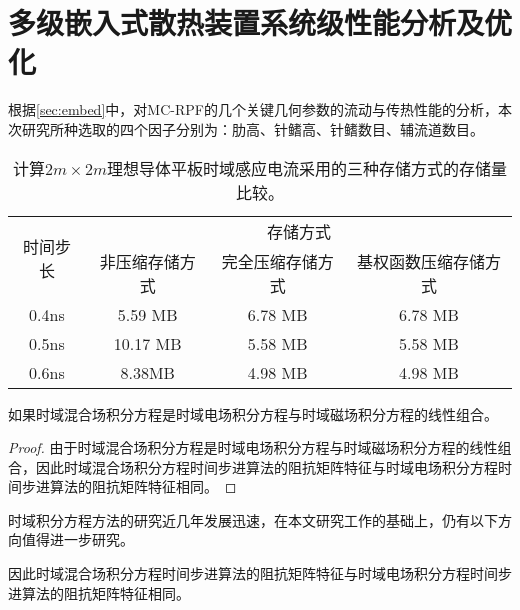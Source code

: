 
\chapter{多级嵌入式散热装置系统级性能分析及优化}

根据\cref{sec:embed}中，对MC-RPF的几个关键几何参数的流动与传热性能的分析，本次研究所种选取的四个因子分别为：肋高、针鳍高、针鳍数目、辅流道数目。

\begin{table}[h]
    \caption{计算$2m\times 2m$理想导体平板时域感应电流采用的三种存储方式的存储量比较。}
    \begin{tabular}{cccc}
        \toprule
        \multirow{2}{*}{时间步长} & \multicolumn{3}{c}{存储方式} \\
        \cmidrule{2-4}
        & 非压缩存储方式 & 完全压缩存储方式 & 基权函数压缩存储方式 \\
        \midrule
        0.4ns & 5.59 MB & 6.78 MB & 6.78 MB\\
        0.5ns & 10.17 MB & 5.58 MB & 5.58 MB \\
        0.6ns & 8.38MB & 4.98 MB & 4.98 MB \\
        \bottomrule
        \end{tabular}
    \label{tablea}
    \end{table}

\begin{theorem}
如果时域混合场积分方程是时域电场积分方程与时域磁场积分方程的线性组合。
\end{theorem}
\begin{proof}
由于时域混合场积分方程是时域电场积分方程与时域磁场积分方程的线性组合，因此时域混合场积分方程时间步进算法的阻抗矩阵特征与时域电场积分方程时间步进算法的阻抗矩阵特征相同。
\end{proof}
\begin{corollary}
时域积分方程方法的研究近几年发展迅速，在本文研究工作的基础上，仍有以下方向值得进一步研究。
\end{corollary}
\begin{lemma}
因此时域混合场积分方程时间步进算法的阻抗矩阵特征与时域电场积分方程时间步进算法的阻抗矩阵特征相同。
\end{lemma}
